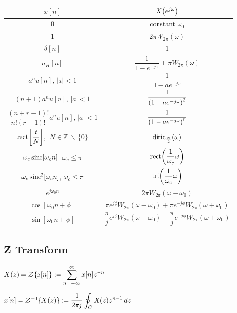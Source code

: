 \documentclass[11pt]{article}
\begin{document}
  \bgroup
  \renewcommand{\arraystretch}{2}
  \setlength{\tabcolsep}{1.2cm}
  \large\begin{tabular}{c|c}
    \(x[n]\) & \(X{\left( e^{j\omega} \right)}\) \\
    \toprule
    \(0\) & constant \(\omega_0\) \\
    \(1\) & \(2\pi W_{2\pi}(\omega)\) \\
    \(\delta[n]\) & \(1\) \\
    \(u_H[n]\) & \(\dfrac{1}{1 - e^{-j\omega}} + \pi W_{2\pi}(\omega)\) \\
    \(a^n u[n]\), \(|a| < 1\) & \(\dfrac{1}{1 - ae^{-j\omega}}\) \\
    \((n + 1)a^n u[n]\), \(|a| < 1\) & \(\dfrac{1}{{\left( 1 - ae^{-j\omega} \right)}^2}\) \\
    \(\dfrac{(n + r - 1)!}{n!(r - 1)!}a^n u[n]\), \(|a| < 1\) & \(\dfrac{1}{{\left( 1 - ae^{-j\omega} \right)}^r}\) \\
    \(\mathrm{rect}{\left[ \dfrac{t}{N} \right]}\), \(\ N \in \mathbb{Z}\ \backslash\ \{0\}\) &
      \(\mathrm{diric}_{\frac{N}{2}}(\omega)\) \\
    \(\omega_c\,\mathrm{sinc}[\omega_c n]\), \(\omega_c \le \pi\) & \(\mathrm{rect}{\left( \dfrac{1}{\omega_c}\omega \right)}\) \\
    \(\omega_c\,\mathrm{sinc}^2[\omega_c n]\), \(\omega_c \le \pi\) & \(\mathrm{tri}{\left( \dfrac{1}{\omega_c}\omega \right)}\) \\
    \(e^{j\omega_0 n}\) & \(2\pi W_{2\pi}(\omega - \omega_0)\) \\
    \(\cos[\omega_0 n + \phi]\) & \(\pi e^{j\phi}W_{2\pi}(\omega - \omega_0) + \pi e^{-j\phi}W_{2\pi}(\omega + \omega_0)\) \\
    \(\sin[\omega_0 n + \phi]\) & \(\dfrac{\pi}{j} e^{j\phi}W_{2\pi}(\omega - \omega_0) -
    \dfrac{\pi}{j} e^{-j\phi}W_{2\pi}(\omega + \omega_0)\) \\
  \end{tabular}
  \egroup

  \pagebreak

  \subsection{Z Transform}
  \begin{multicols}{2}
    \(X(z) = \mathcal{Z}{\left\{ x[n] \right\}} := \displaystyle \sum_{n = -\infty}^{\infty} x[n]z^{-n}\)

    \columnbreak

    \(x[n] = \mathcal{Z}^{-1}{\left\{ X(z) \right\}} := \displaystyle \dfrac{1}{2\pi j} \oint_{C} X(z)z^{n - 1}\, dz\)
  \end{multicols}
\end{document}
